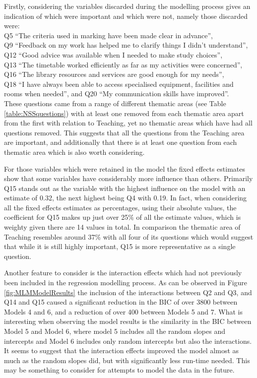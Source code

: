 \documentclass[11pt,a4paper]{report}
\begin{document}
Firstly, considering the variables discarded during the modelling process gives an indication of which were important and which were not, namely those discarded were:\\
Q5 ``The criteria used in marking have been made clear in advance'',\\ 
Q9 ``Feedback on my work has helped me to clarify things I didn't understand'', \\
Q12 ``Good advice was available when I needed to make study choices'',\\ 
Q13 ``The timetable worked efficiently as far as my activities were concerned'',\\ 
Q16 ``The library resources and services are good enough for my needs'', \\
Q18 ``I have always been able to access specialised equipment, facilities and rooms when needed'', and
Q20 ``My communication skills have improved''.\\ 
These questions came from a range of different thematic areas (see Table \ref{table:NSSquestions}) with at least one removed from each thematic area apart from the first with relation to Teaching, yet no thematic areas which have had all questions removed. This suggests that all the questions from the Teaching area are important, and additionally that there is at least one question from each thematic area which is also worth considering.

For those variables which were retained in the model the fixed effects estimates show that some variables have considerably more influence than others. Primarily Q15 stands out as the variable with the highest influence on the model with an estimate of 0.32, the next highest being Q4 with 0.19. In fact, when considering all the fixed effects estimates as percentages, using their absolute values, the coefficient for Q15 makes up just over 25\% of all the estimate values, which is weighty given there are 14 values in total. In comparison the thematic area of Teaching resembles around 37\% with all four of its questions which would suggest that while it is still highly important, Q15 is more representative as a single question. 

Another feature to consider is the interaction effects which had not previously been included in the regression modelling process. As can be observed in Figure \ref{fig:MLMModelResults} the inclusion of the interactions between Q2 and Q3, and Q14 and Q15 caused a significant reduction in the BIC of over 3800 between Models 4 and 6, and a reduction of over 400 between Models 5 and 7. What is interesting when observing the model results is the similarity in the BIC between Model 5 and Model 6, where model 5 includes all the random slopes and intercepts and Model 6 includes only random intercepts but also the interactions. It seems to suggest that the interaction effects improved the model almost as much as the random slopes did, but with significantly less run-time needed. This may be something to consider for attempts to model the data in the future. 
\end{document}
